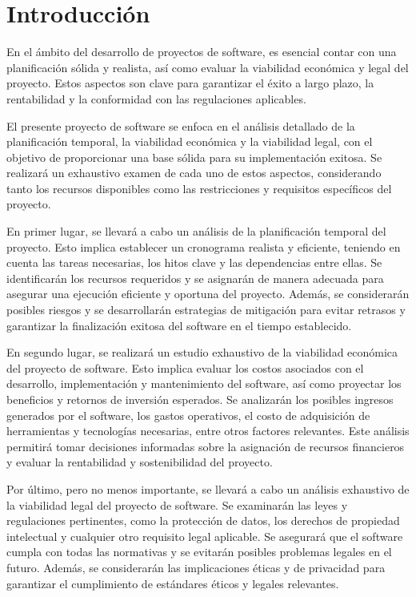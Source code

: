 
\section{Introducción}

En el ámbito del desarrollo de proyectos de software, es esencial contar con una planificación
sólida y realista, así como evaluar la viabilidad económica y legal del proyecto. Estos aspectos 
son clave para garantizar el éxito a largo plazo, la rentabilidad y la conformidad con las 
regulaciones aplicables.

El presente proyecto de software se enfoca en el análisis detallado de la planificación temporal,
la viabilidad económica y la viabilidad legal, con el objetivo de proporcionar una base sólida
para su implementación exitosa. Se realizará un exhaustivo examen de cada uno de estos aspectos,
considerando tanto los recursos disponibles como las restricciones y requisitos específicos del
proyecto.

En primer lugar, se llevará a cabo un análisis de la planificación temporal del proyecto. Esto
implica establecer un cronograma realista y eficiente, teniendo en cuenta las tareas necesarias,
los hitos clave y las dependencias entre ellas. Se identificarán los recursos requeridos y se
asignarán de manera adecuada para asegurar una ejecución eficiente y oportuna del proyecto. 
Además, se considerarán posibles riesgos y se desarrollarán estrategias de mitigación para 
evitar retrasos y garantizar la finalización exitosa del software en el tiempo establecido.

En segundo lugar, se realizará un estudio exhaustivo de la viabilidad económica del proyecto 
de software. Esto implica evaluar los costos asociados con el desarrollo, implementación y 
mantenimiento del software, así como proyectar los beneficios y retornos de inversión esperados. 
Se analizarán los posibles ingresos generados por el software, los gastos operativos, el 
costo de adquisición de herramientas y tecnologías necesarias, entre otros factores 
relevantes. Este análisis permitirá tomar decisiones informadas sobre la asignación de 
recursos financieros y evaluar la rentabilidad y sostenibilidad del proyecto.

Por último, pero no menos importante, se llevará a cabo un análisis exhaustivo de la viabilidad 
legal del proyecto de software. Se examinarán las leyes y regulaciones pertinentes, como la 
protección de datos, los derechos de propiedad intelectual y cualquier otro requisito legal 
aplicable. Se asegurará que el software cumpla con todas las normativas y se evitarán posibles 
problemas legales en el futuro. Además, se considerarán las implicaciones éticas y de privacidad 
para garantizar el cumplimiento de estándares éticos y legales relevantes.

